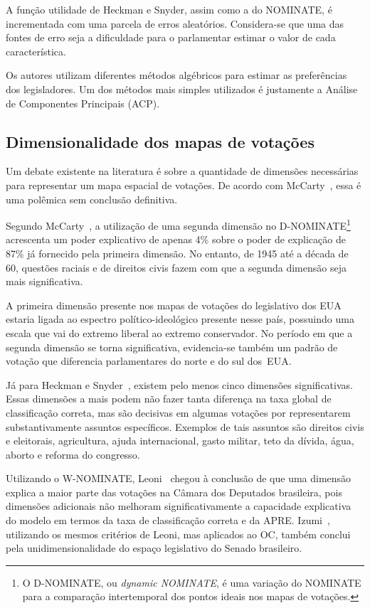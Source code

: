 \documentclass[
	article,			%
	12pt,				%
	oneside,			%
	a4paper,			%
	english,			%
	brazil,				%
	sumario=tradicional,
	oldfontcommands %
	]{abntex2}
\newcommand\nominate{NOMINATE\xspace}
\begin{document}
A função utilidade de Heckman e Snyder, assim como a do NOMINATE, é incrementada com uma parcela de erros aleatórios. Considera-se que uma das fontes de erro seja a dificuldade para o parlamentar estimar o valor de cada característica. 

Os autores utilizam diferentes métodos algébricos para estimar as preferências dos legisladores. Um dos métodos mais simples utilizados é justamente a Análise de Componentes Principais (ACP). 

\subsection{Dimensionalidade dos mapas de votações}

Um debate existente na literatura é sobre a quantidade de dimensões necessárias para representar um mapa espacial de votações. De acordo com McCarty~\cite{mccarty2011measuring}, essa é uma polêmica sem conclusão definitiva.

Segundo McCarty~\cite{mccarty2011measuring}, a utilização de uma segunda dimensão no D-NOMINATE\footnote{O D-NOMINATE, ou \emph{dynamic \nominate}, é uma variação do \nominate para a comparação intertemporal dos pontos ideais nos mapas de votações.} acrescenta um poder explicativo de apenas 4\% sobre o poder de explicação de 87\% já fornecido pela primeira dimensão. No entanto, de 1945 até a década de 60, questões raciais e de direitos civis fazem com que a segunda dimensão seja mais significativa. 

A primeira dimensão presente nos mapas de votações do legislativo dos EUA estaria ligada ao espectro político-ideológico presente nesse país, possuindo uma escala que vai do extremo liberal ao extremo conservador. No período em que a segunda dimensão se torna significativa, evidencia-se também um padrão de votação que diferencia parlamentares do norte e do sul dos~EUA.  

Já para Heckman e Snyder~\cite{heckman-snyder1997}, existem pelo menos cinco dimensões significativas. Essas dimensões a mais podem não fazer tanta diferença na taxa global de classificação correta, mas são decisivas em algumas votações por representarem substantivamente assuntos específicos. Exemplos de tais assuntos são direitos civis e eleitorais, agricultura, ajuda internacional, gasto militar, teto da dívida, água, aborto e reforma do congresso.

Utilizando o W-NOMINATE, Leoni~\cite{leoni02cdep} chegou à conclusão de que uma dimensão explica a maior parte das votações na Câmara dos Deputados brasileira, pois dimensões adicionais não melhoram significativamente a capacidade explicativa do modelo em termos da taxa de classificação correta e da APRE. Izumi~\cite{izumi2016senado}, utilizando os mesmos critérios de Leoni, mas aplicados ao OC, também conclui pela unidimensionalidade do espaço legislativo do Senado brasileiro.
\end{document}

